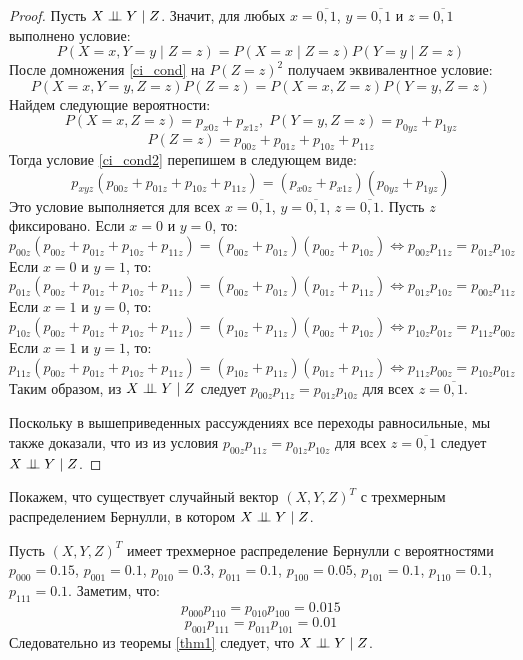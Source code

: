 \begin{proof}
    Пусть $X \perp\!\!\!\perp Y \mid Z$. Значит, для любых $x=\overline{0,1}$, $y=\overline{0,1}$ и $z=\overline{0,1}$ выполнено условие:
    \begin{equation}\label{ci_cond}
        P(X=x, Y=y \mid Z = z) = P(X=x \mid Z = z) P(Y=y \mid Z = z)
    \end{equation}
    После домножения \eqref{ci_cond} на $P(Z=z)^2$ получаем эквивалентное условие:
    \begin{equation}\label{ci_cond2}
        P(X=x,Y=y,Z=z)P(Z=z)=P(X=x,Z=z)P(Y=y,Z=z)
    \end{equation}
    Найдем следующие вероятности:
    $$
        P(X=x, Z=z) = p_{x0z} + p_{x1z},\;  P(Y=y, Z=z) = p_{0yz} + p_{1yz}
    $$
    $$
        P(Z=z)= p_{00z} + p_{01z} + p_{10z} + p_{11z}
    $$
    Тогда условие \eqref{ci_cond2} перепишем в следующем виде:
    $$
        p_{xyz} (p_{00z} + p_{01z} + p_{10z} + p_{11z}) = (p_{x0z} + p_{x1z}) (p_{0yz} + p_{1yz})
    $$
    Это условие выполняется для всех $x=\overline{0,1}$, $y=\overline{0,1}$, $z=\overline{0,1}$.
    Пусть $z$ фиксировано.
    Если $x=0$ и $y=0$, то:
    $$
        p_{00z} (p_{00z} + p_{01z} + p_{10z} + p_{11z}) = (p_{00z} + p_{01z}) (p_{00z} + p_{10z})
    \Leftrightarrow
        p_{00z} p_{11z} = p_{01z} p_{10z}
    $$
    Если $x=0$ и $y=1$, то:
    $$
        p_{01z} (p_{00z} + p_{01z} + p_{10z} + p_{11z}) = (p_{00z} + p_{01z}) (p_{01z} + p_{11z})
    \Leftrightarrow
        p_{01z}p_{10z}=p_{00z} p_{11z}
    $$
    Если $x=1$ и $y=0$, то:
    $$
        p_{10z} (p_{00z} + p_{01z} + p_{10z} + p_{11z}) = (p_{10z} + p_{11z}) (p_{00z} + p_{10z})
    \Leftrightarrow
        p_{10z} p_{01z} = p_{11z}p_{00z}
    $$
    Если $x=1$ и $y=1$, то:
    $$
        p_{11z} (p_{00z} + p_{01z} + p_{10z} + p_{11z}) = (p_{10z} + p_{11z}) (p_{01z} + p_{11z})
    \Leftrightarrow
        p_{11z} p_{00z} = p_{10z} p_{01z}
    $$
    Таким образом, из $X \perp\!\!\!\perp Y \mid Z$ следует
    $p_{00z}p_{11z}=p_{01z}p_{10z}$ для всех $z=\overline{0,1}$.

    Поскольку в вышеприведенных рассуждениях все переходы равносильные,
    мы также доказали, что из из условия $p_{00z}p_{11z}=p_{01z}p_{10z}$ для всех $z=\overline{0,1}$
    следует $X \perp\!\!\!\perp Y \mid Z$.
\end{proof}
Покажем, что существует случайный вектор $(X,Y,Z)^T$ с трехмерным распределением Бернулли, в котором $X \perp\!\!\!\perp Y \mid Z$.
\begin{example}
    Пусть $(X,Y,Z)^T$ имеет трехмерное распределение Бернулли с вероятностями
    $p_{000}=0.15$, $p_{001}=0.1$, $p_{010}=0.3$, $p_{011}=0.1$, $p_{100}=0.05$, $p_{101}=0.1$,
    $p_{110}=0.1$, $p_{111}=0.1$.
    Заметим, что:
    $$p_{000}p_{110}=p_{010}p_{100}=0.015$$ $$p_{001}p_{111}=p_{011}p_{101}=0.01$$
    Следовательно из теоремы \ref{thm1} следует, что $X \perp\!\!\!\perp Y \mid Z$.
\end{example}
